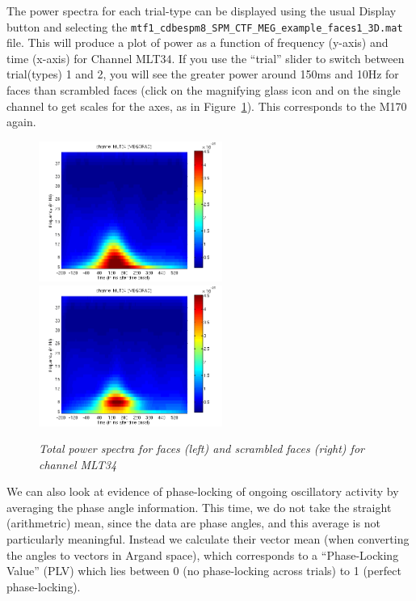 The power spectra for each trial-type can be displayed using the usual Display button and selecting the \texttt{mtf1\_\-cdbespm8\_\-SPM\_\-CTF\_\-MEG\_\-example\_\-faces1\_3D.mat} file. This will produce a plot of power as a function of frequency (y-axis) and time (x-axis) for Channel MLT34. If you use the ``trial'' slider to switch between trial(types) 1 and 2, you will see the greater power around 150ms and 10Hz for faces than scrambled faces (click on the magnifying glass icon and on the single channel to get scales for the axes, as in Figure~\ref{multimodal:fig:13}). This corresponds to the M170 again.

\begin{figure}
\begin{center}
\includegraphics[width=60mm]{multimodal/figures/meg_pow_faces}
\includegraphics[width=60mm]{multimodal/figures/meg_pow_scrambled}
\caption{\em  Total power spectra for faces (left) and scrambled faces (right) for channel MLT34\label{multimodal:fig:13}}
\end{center}
\end{figure}

We can also look at evidence of phase-locking of ongoing oscillatory activity by averaging the phase angle information. This time, we do not take the straight (arithmetric) mean, since the data are phase angles, and this average is not particularly meaningful. Instead we calculate their vector mean (when converting the angles to vectors in Argand space), which corresponds to a ``Phase-Locking Value'' (PLV) which lies between 0 (no phase-locking across trials) to 1 (perfect phase-locking).

